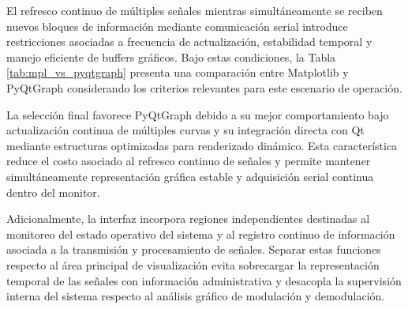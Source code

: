 El refresco continuo de múltiples señales mientras simultáneamente se reciben nuevos bloques de información mediante comunicación serial introduce restricciones asociadas a frecuencia de actualización, estabilidad temporal y manejo eficiente de buffers gráficos. Bajo estas condiciones, la Tabla \ref{tab:mpl_vs_pyqtgraph} presenta una comparación entre Matplotlib y PyQtGraph considerando los criterios relevantes para este escenario de operación.

\begin{table}[H]
\centering
\caption{Comparación entre Matplotlib y PyQtGraph para visualización continua}
\label{tab:mpl_vs_pyqtgraph}
\end{table}

La selección final favorece PyQtGraph debido a su mejor comportamiento bajo actualización continua de múltiples curvas y su integración directa con Qt mediante estructuras optimizadas para renderizado dinámico. Esta característica reduce el costo asociado al refresco continuo de señales y permite mantener simultáneamente representación gráfica estable y adquisición serial continua dentro del monitor.

Adicionalmente, la interfaz incorpora regiones independientes destinadas al monitoreo del estado operativo del sistema y al registro continuo de información asociada a la transmisión y procesamiento de señales. Separar estas funciones respecto al área principal de visualización evita sobrecargar la representación temporal de las señales con información administrativa y desacopla la supervisión interna del sistema respecto al análisis gráfico de modulación y demodulación.

